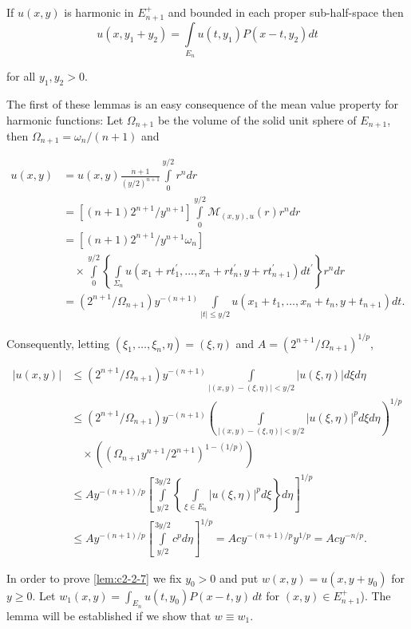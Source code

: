 \begin{lemma}
\label{lem:c2-2-7}
If $u(x, y)$ is harmonic in $E_{n+1}^{+}$ and bounded in each proper sub-half-space then
\[
u(x,y_{1}+y_{2})=\int\limits_{E_{n}}u(t,y_{1})P(x-t,y_{2})dt
\]

for all $y_{1}, y_{2} > 0$.
\end{lemma}

The first of these lemmas is an easy consequence of the mean value property for harmonic functions: Let $\Omega_{n+1}$ be the volume of the solid unit sphere of $E_{n+1}$, then $\Omega_{n+1} = \omega_n/(n+1)$ and

\[
\begin{aligned}u(x,y)&=u(x,y)\frac{n+1}{(y/2)^{n+1}}\int\limits_{0}^{y/2}r^{n} dr\\&=\left[(n+1)2^{n+1}/y^{n+1}\right]\int\limits_{0}^{y/2}\mathcal{M}_{(x,y),u}(r)r^{n} dr\\&=\left[(n+1)2^{n+1}/y^{n+1}\omega_{n}\right]\\&\quad\times\int\limits_{0}^{y/2}\left\{\int\limits_{\Sigma_{n}}u(x_{1}+rt_{1}^{\prime},\ldots,x_{n}+rt_{n}^{\prime},y+rt_{n+1}^{\prime})dt^{\prime}\right\}r^{n} dr\\&=(2^{n+1}/\Omega_{n+1})y^{-(n+1)}\int\limits_{|t|\leq y/2}u(x_{1}+t_{1},\ldots,x_{n}+t_{n},y+t_{n+1})dt.\end{aligned}
\]

Consequently, letting $(\xi_1, \ldots, \xi_n, \eta) = (\xi, \eta)$ and $A = (2^{n+1}/\Omega_{n+1})^{1/p}$,

\[
\begin{aligned}|u(x,y)|&\leq(2^{n+1}/\Omega_{n+1})y^{-(n+1)}\int\limits_{|(x,y)-(\xi,\eta)|<y/2}|u(\xi,\eta)|d\xi d\eta\\&\leq(2^{n+1}/\Omega_{n+1})y^{-(n+1)}\left(\int\limits_{|(x,y)-(\xi,\eta)|<y/2}|u(\xi,\eta)|^{p} d\xi d\eta\right)^{1/p}\\&\quad\times\left((\Omega_{n+1}y^{n+1}/2^{n+1})^{1-(1/p)}\right)\\&\leq A y^{-(n+1)/p}\left[\int\limits_{y/2}^{3y/2}\left\{\int\limits_{\xi\in E_{n}}|u(\xi,\eta)|^{p} d\xi\right\}d\eta\right]^{1/p}\\&\leq A y^{-(n+1)/p}\left[\int\limits_{y/2}^{3y/2}c^{p} d\eta\right]^{1/p}=Acy^{-(n+1)/p}y^{1/p}=Acy^{-n/p}.\end{aligned}
\]

In order to prove \eqref{lem:c2-2-7} we fix $y_0 > 0$ and put $w(x, y) = u(x, y + y_0)$ for $y \geq 0$. Let $w_1(x, y) = \int_{E_n} u(t, y_0) P(x - t, y) \, dt$ for $(x, y) \in E_{n+1}^+$). The lemma will be established if we show that $w \equiv w_1$.

